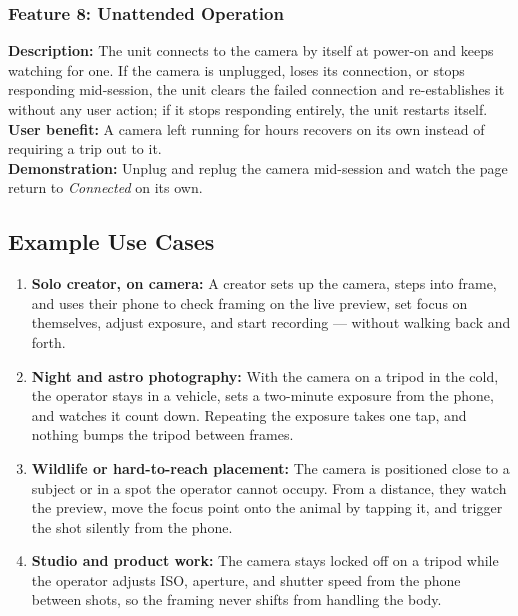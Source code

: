 \documentclass[11pt,a4paper]{article}
\begin{document}
\subsubsection{Feature 8: Unattended Operation}
\textbf{Description:} The unit connects to the camera by itself at power-on and keeps watching for one. If the camera is unplugged, loses its connection, or stops responding mid-session, the unit clears the failed connection and re-establishes it without any user action; if it stops responding entirely, the unit restarts itself.\\
\textbf{User benefit:} A camera left running for hours recovers on its own instead of requiring a trip out to it.\\
\textbf{Demonstration:} Unplug and replug the camera mid-session and watch the page return to \textit{Connected} on its own.

\subsection{Example Use Cases}
\begin{enumerate}[leftmargin=1.5em]
    \item \textbf{Solo creator, on camera:} A creator sets up the camera, steps into frame, and uses their phone to check framing on the live preview, set focus on themselves, adjust exposure, and start recording --- without walking back and forth.
    \item \textbf{Night and astro photography:} With the camera on a tripod in the cold, the operator stays in a vehicle, sets a two-minute exposure from the phone, and watches it count down. Repeating the exposure takes one tap, and nothing bumps the tripod between frames.
    \item \textbf{Wildlife or hard-to-reach placement:} The camera is positioned close to a subject or in a spot the operator cannot occupy. From a distance, they watch the preview, move the focus point onto the animal by tapping it, and trigger the shot silently from the phone.
    \item \textbf{Studio and product work:} The camera stays locked off on a tripod while the operator adjusts ISO, aperture, and shutter speed from the phone between shots, so the framing never shifts from handling the body.
\end{enumerate}
\end{document}
